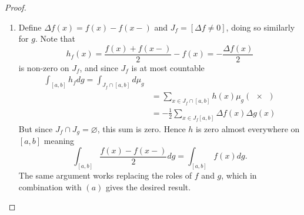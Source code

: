 \documentclass[hw_all.tex]{subfiles}
\begin{document}
\begin{proof}
\begin{enumerate}
        \item 
            Define $\Delta f(x) = f(x) - f(x-)$ and $J_f = [\Delta f \neq 0]$, doing so similarly for $g$. Note that
            \[
                h_f(x) = \frac{f(x) + f(x-)}{2} - f(x) = -\frac{\Delta f(x)}{2}
            \]
            is non-zero on $J_f$, and since $J_f$ is at most countable
            \begin{align*}
                \int_{[a,b]} h_f dg = \int_{J_f \cap [a,b]} d \mu_g \\
                &= \sum_{x \in J_f \cap [a,b]} h(x) \mu_g(\qty{x}) \\
                &= -\frac{1}{2} \sum_{x \in J_f[a,b]} \Delta f(x) \Delta g(x)
            \end{align*}
            But since $J_f \cap J_g = \varnothing$, this sum is zero. Hence $h$ is zero almost everywhere on $[a,b]$ meaning
            \[
                \int_{[a,b]} \frac{f(x) - f(x-)}{2} dg = \int_{[a,b]} f(x) dg
            .\]
            The same argument works replacing the roles of $f$ and $g$, which in combination with $(a)$ gives the desired result.
    \end{enumerate}
\end{proof}
\end{document}
